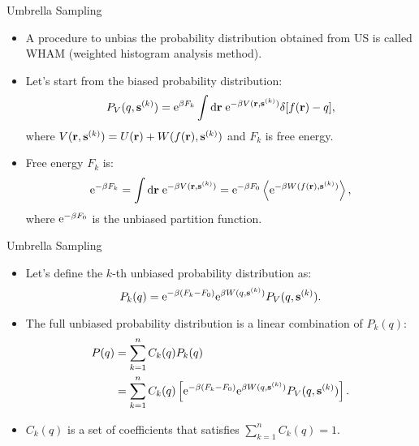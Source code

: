 \documentclass[10pt]{beamer}
\begin{document}
\begin{frame}{Umbrella Sampling}
\begin{itemize}
\setlength\itemsep{1em}
  \item A procedure to unbias the probability distribution obtained from US is called WHAM (weighted histogram analysis method).
  \item Let's start from the biased probability distribution:
  \begin{equation}
    P_V(q,{\bf s}^{(k)}) = \mathrm{e}^{\beta F_k} \int\mathrm{d}{\bf r}\; \mathrm{e}^{-\beta V({\bf r},{\bf s}^{(k)})} \delta[f({\bf r})-q],
  \end{equation}
  where $V({\bf r},{\bf s}^{(k)})=U({\bf r})+W(f({\bf r}),{\bf s}^{(k)})$ and $F_k$ is free energy.
  \item Free energy $F_k$ is:
  \begin{equation}
    \mathrm{e}^{-\beta F_k} = \int\mathrm{d}{\bf r}\; \mathrm{e}^{-\beta V({\bf r},{\bf s}^{(k)})} = \mathrm{e}^{-\beta F_0} \left< \mathrm{e}^{-\beta W(f({\bf r}),{\bf s}^{(k)})} \right>,
  \end{equation}
  where $\mathrm{e}^{-\beta F_0}$ is the unbiased partition function.
\end{itemize}
\end{frame}

\begin{frame}{Umbrella Sampling}
\begin{itemize}
\setlength\itemsep{1em}
  \item Let's define the $k$-th unbiased probability distribution as:
  \begin{equation}
    P_k(q) = \mathrm{e}^{-\beta(F_k - F_0)}\mathrm{e}^{\beta W(q,{\bf s}^{(k)})} P_V(q,{\bf s}^{(k)}).
  \end{equation}
  \item The full unbiased probability distribution is a linear combination of $P_k(q)$:
  \begin{align}
    P(q) &= \sum_{k=1}^n C_k(q) P_k(q) \\
         &= \sum_{k=1}^n C_k(q) \left[ \mathrm{e}^{-\beta(F_k - F_0)}\mathrm{e}^{\beta W(q,{\bf s}^{(k)})} P_V(q,{\bf s}^{(k)}) \right].
  \end{align}
  \item $C_k(q)$ is a set of coefficients that satisfies $\sum_{k=1}^n C_k(q) = 1$.
\end{itemize}
\end{frame}
\end{document}
